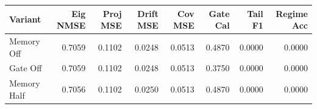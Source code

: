 \begin{tabular}{lrrrrrrr}
\toprule
Variant & Eig NMSE & Proj MSE & Drift MSE & Cov MSE & Gate Cal & Tail F1 & Regime Acc \\
\midrule
Memory Off & 0.7059 & 0.1102 & 0.0248 & 0.0513 & 0.4870 & 0.0000 & 0.0000 \\
Gate Off & 0.7059 & 0.1102 & 0.0248 & 0.0513 & 0.3750 & 0.0000 & 0.0000 \\
Memory Half & 0.7056 & 0.1102 & 0.0250 & 0.0513 & 0.4870 & 0.0000 & 0.0000 \\
\bottomrule
\end{tabular}